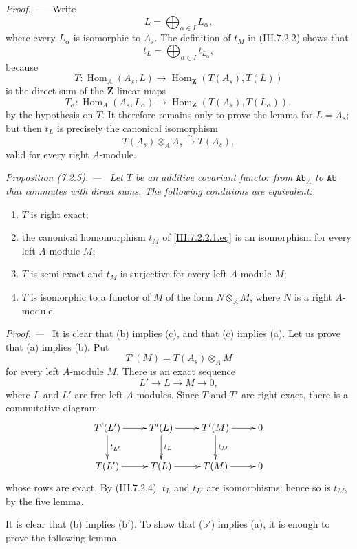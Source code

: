 \documentclass[10pt,oneside]{book}
\newcommand{\bb}[1]{\mathbf{#1}}
\newcommand{\cat}[1]{\mathtt{#1}}
\newcommand{\Hom}{\operatorname{Hom}}
\newcommand{\sref}[2][]{(#2)}
\newcommand{\oldpage}[2][]{\setcounter{footnote}{0}\marginpar{\scriptsize\textbf{#1}~|~#2}\ignorespaces}
\newenvironment{proposition}[1][]{\par\medskip\noindent\itshape Proposition (#1). ---\ }{\par}
\newenvironment{proof}{\par\medskip\noindent\textit{Proof. ---\ }}{\par}
\begin{document}
\begin{proof}
Write
\[
  L=\bigoplus_{\alpha\in I}L_\alpha,
\]
where every $L_\alpha$ is isomorphic to $A_s$.  The definition
of $t_M$ in \sref{III.7.2.2} shows that
\[
  t_L=\bigoplus_{\alpha\in I}t_{L_\alpha},
\]
because
\[
  T:
  \Hom_A(A_s,L)
  \longrightarrow
  \Hom_{\bb Z}(T(A_s),T(L))
\]
is the direct sum of the $\bb Z$-linear maps
\[
  T_\alpha:
  \Hom_A(A_s,L_\alpha)
  \longrightarrow
  \Hom_{\bb Z}(T(A_s),T(L_\alpha)),
\]
by the hypothesis on $T$.  It therefore remains only to prove
the lemma for $L=A_s$; but then $t_L$ is precisely the canonical
isomorphism
\[
  T(A_s)\otimes_A A_s
  \xrightarrow{\sim}
  T(A_s),
\]
valid for every right $A$-module.
\end{proof}

\begin{proposition}[7.2.5]
\label{III.7.2.5}
Let $T$ be an additive covariant functor from $\cat{Ab}_A$ to
$\cat{Ab}$ that commutes with direct sums.  The following
conditions are equivalent:
\begin{enumerate}
  \item[(a)] $T$ is right exact;
  \item[(b)] the canonical homomorphism $t_M$ of
    \eqref{III.7.2.2.1.eq} is an isomorphism for every left
    $A$-module $M$;
  \item[($\mathrm{b}'$)] $T$ is semi-exact and $t_M$ is
    surjective for every left $A$-module $M$;
  \item[(c)] $T$ is isomorphic to a functor of $M$ of the form
    $N\otimes_A M$, where $N$ is a right $A$-module.
\end{enumerate}
\end{proposition}

\begin{proof}
It is clear that (b) implies (c), and that (c) implies (a).
Let us prove that (a) implies (b).
\oldpage[III]{179}
Put
\[
  T'(M)=T(A_s)\otimes_A M
\]
for every left $A$-module $M$.  There is an exact sequence
\[
  L'\longrightarrow L\longrightarrow M\longrightarrow0,
\]
where $L$ and $L'$ are free left $A$-modules.  Since $T$ and
$T'$ are right exact, there is a commutative diagram
\[
\xymatrix{
  T'(L')\ar[r]\ar[d]^{t_{L'}}
  & T'(L)\ar[r]\ar[d]^{t_L}
  & T'(M)\ar[r]\ar[d]^{t_M}
  & 0
  \\
  T(L')\ar[r]
  & T(L)\ar[r]
  & T(M)\ar[r]
  & 0
}
\]
whose rows are exact.  By \sref{III.7.2.4}, $t_L$ and
$t_{L'}$ are isomorphisms; hence so is $t_M$, by the five
lemma.

It is clear that (b) implies ($\mathrm{b}'$).  To show that
($\mathrm{b}'$) implies (a), it is enough to prove the following
lemma.
\end{proof}
\end{document}

